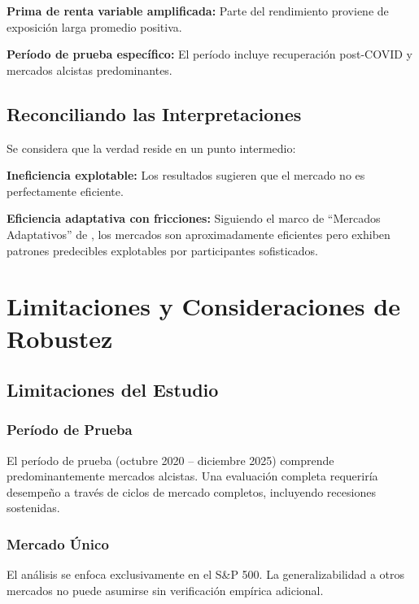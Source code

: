 \documentclass[11pt,a4paper]{article}
\begin{document}
\textbf{Prima de renta variable amplificada:} Parte del rendimiento proviene de exposici\'on larga promedio positiva.

\textbf{Per\'iodo de prueba espec\'ifico:} El per\'iodo incluye recuperaci\'on post-COVID y mercados alcistas predominantes.

\subsection{Reconciliando las Interpretaciones}

Se considera que la verdad reside en un punto intermedio:

\textbf{Ineficiencia explotable:} Los resultados sugieren que el mercado no es perfectamente eficiente.

\textbf{Eficiencia adaptativa con fricciones:} Siguiendo el marco de ``Mercados Adaptativos'' de \citet{lo2019}, los mercados son aproximadamente eficientes pero exhiben patrones predecibles explotables por participantes sofisticados.

\section{Limitaciones y Consideraciones de Robustez}

\subsection{Limitaciones del Estudio}

\subsubsection{Per\'iodo de Prueba}

El per\'iodo de prueba (octubre 2020 -- diciembre 2025) comprende predominantemente mercados alcistas. Una evaluaci\'on completa requerir\'ia desempe\~no a trav\'es de ciclos de mercado completos, incluyendo recesiones sostenidas.

\subsubsection{Mercado \'Unico}

El an\'alisis se enfoca exclusivamente en el S\&P 500. La generalizabilidad a otros mercados no puede asumirse sin verificaci\'on emp\'irica adicional.
\end{document}
